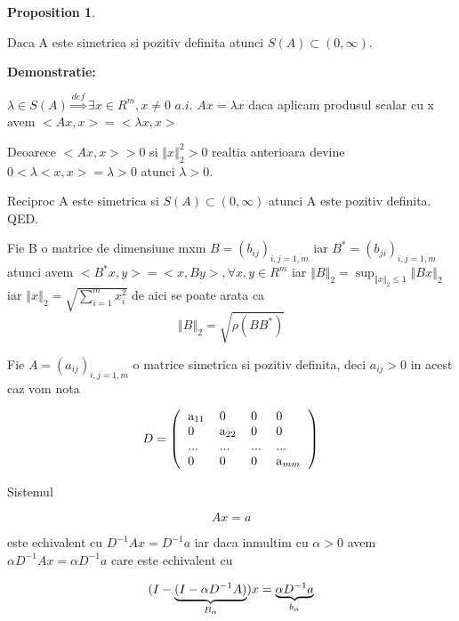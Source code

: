 \documentclass[a4paper,twoside]{book}
\newtheorem{proposition}[theorem]{Proposition}
\begin{document}
\begin{proposition}
\thinspace \qquad \label{REL_1}
\end{proposition}

Daca A este simetrica si pozitiv definita atunci $S(A)\subset (0,\infty )$.

\textbf{Demonstratie:}

$\lambda \in S(A)\overset{def}{\Rightarrow }\exists x\in R^{m},x\neq
0\,\,a.i.\,\,Ax=\lambda x$ daca aplicam produsul scalar cu x avem $%
<Ax,x>=<\lambda x,x>$

Deoarece $<Ax,x>>0$ si $\left\Vert x\right\Vert _{2}^{2}>0$ realtia
anterioara devine $0<\lambda <x,x>=\lambda >0$ atunci $\lambda >0$.

Reciproc A este simetrica si $S(A)\subset (0,\infty )$ atunci A este pozitiv
definita. QED.

Fie B o matrice de dimensiune mxm $B=(b_{ij})_{i,j=\overline{1,m}}$ iar $%
B^{\ast }=(b_{ji})_{i,j=\overline{1,m}}$ atunci avem $<B^{\ast
}x,y>=<x,By>,\forall x,y\in R^{m}$ iar $\left\Vert B\right\Vert
_{2}=\sup_{\left\Vert x\right\Vert _{2}\leq 1}\left\Vert Bx\right\Vert _{2}$
iar $\left\Vert x\right\Vert _{2}=\sqrt{\sum_{i=1}^{m}x_{i}^{2}}$ de aici se
poate arata ca 
\begin{equation}
\left\Vert B\right\Vert _{2}=\sqrt{\rho (BB^{\ast })}  \label{R1}
\end{equation}

Fie $A=(a_{ij})_{i,j=\overline{1,m}}$ o matrice simetrica si pozitiv
definita, deci $a_{ij}>0$ in acest caz vom nota

\begin{equation*}
D=\left( 
\begin{tabular}{llll}
a$_{11}$ & 0 & 0 & 0 \\ 
0 & a$_{22}$ & 0 & 0 \\ 
... & ... & ... & ... \\ 
0 & 0 & 0 & a$_{mm}$%
\end{tabular}%
\right)
\end{equation*}

Sistemul

\begin{equation}
Ax=a  \label{R2}
\end{equation}

este echivalent cu $D^{-1}Ax=D^{-1}a$ iar daca inmultim cu $\alpha >0$ avem $%
\alpha D^{-1}Ax=\alpha D^{-1}a$ care este echivalent cu

\begin{equation*}
(I-\underset{B_{\alpha }}{\underbrace{(I-\alpha D^{-1}A)}})x=\underset{%
b_{\alpha }}{\underbrace{\alpha D^{-1}a}}
\end{equation*}
\end{document}
